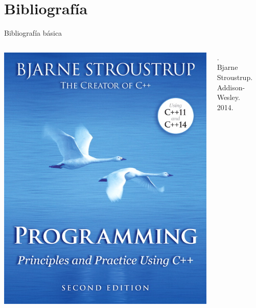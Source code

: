 \section{Bibliografía}

\begin{frame}[t]{Bibliografía básica}
\begin{columns}

\includegraphics[width=\linewidth]{images/ppp-2e.jpg}

.\\
Bjarne Stroustrup.\\
Addison-Wesley.\\
2014.

\end{columns}
\end{frame}

